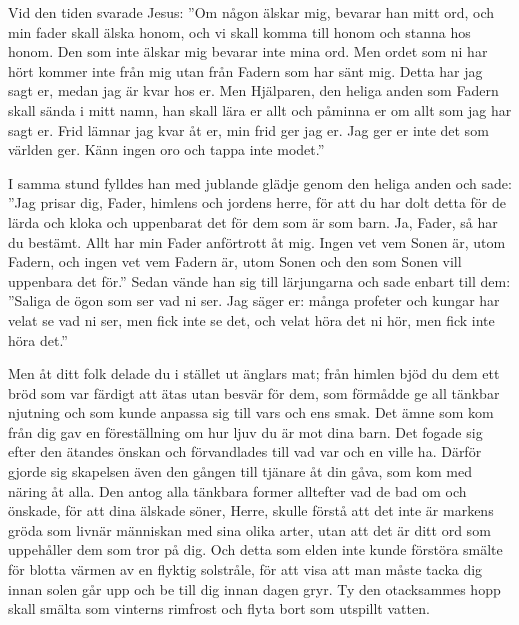 {Vid den tiden svarade Jesus: ”Om någon älskar mig, bevarar han mitt ord, och min fader skall älska honom, och vi skall komma till honom och stanna hos honom. 
Den som inte älskar mig bevarar inte mina ord. Men ordet som ni har hört kommer inte från mig utan från Fadern som har sänt mig.
Detta har jag sagt er, medan jag är kvar hos er. 
Men Hjälparen, den heliga anden som Fadern skall sända i mitt namn, han skall lära er allt och påminna er om allt som jag har sagt er. 
Frid lämnar jag kvar åt er, min frid ger jag er. Jag ger er inte det som världen ger. Känn ingen oro och tappa inte modet.''}


{I samma stund fylldes han med jublande glädje genom den heliga anden och sade: ”Jag prisar dig, Fader, himlens och jordens herre, för att du har dolt detta för de lärda och kloka och uppenbarat det för dem som är som barn. Ja, Fader, så har du bestämt. 
Allt har min Fader anförtrott åt mig. Ingen vet vem Sonen är, utom Fadern, och ingen vet vem Fadern är, utom Sonen och den som Sonen vill uppenbara det för.” 
Sedan vände han sig till lärjungarna och sade enbart till dem: ”Saliga de ögon som ser vad ni ser. 
Jag säger er: många profeter och kungar har velat se vad ni ser, men fick inte se det, och velat höra det ni hör, men fick inte höra det.”}


{Men åt ditt folk delade du i stället ut änglars mat; från himlen bjöd du dem
ett bröd som var färdigt att ätas utan besvär för dem, som förmådde ge all tänkbar njutning och som kunde anpassa sig till vars och ens smak. Det ämne som
kom från dig gav en föreställning om hur ljuv du är mot dina barn. Det fogade
sig efter den ätandes önskan och förvandlades till vad var och en ville ha. 
Därför gjorde sig skapelsen även den gången till tjänare åt din gåva, som kom
med näring åt alla. Den antog alla tänkbara former alltefter vad de bad om och
önskade, för att dina älskade söner, Herre, skulle förstå att det inte är markens gröda som livnär människan med sina olika arter, utan att det är ditt ord
som uppehåller dem som tror på dig. Och detta som elden inte kunde förstöra
smälte för blotta värmen av en flyktig solstråle, för att visa att man måste
tacka dig innan solen går upp och be till dig innan dagen gryr. Ty den otacksammes hopp skall smälta som vinterns rimfrost och flyta bort som utspillt vatten.}



